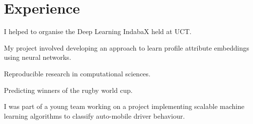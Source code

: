 \documentclass[]{deedy-resume-openfont}
\begin{document}
\begin{minipage}[t]{0.66\textwidth} 


\section{Experience}

\vspace{\topsep}
\begin{tightemize}
\item I helped to organise the Deep Learning IndabaX held at UCT. \href{https://indabax.github.io/}{\custombold{[link]}}
\end{tightemize}
\sectionsep

\begin{tightemize}
\item My project involved developing an approach to learn profile attribute embeddings using neural networks. \href{http://praelexis.com/2017/05/03/1236/}{\custombold{[link]}}
\end{tightemize}
\sectionsep

\begin{tightemize}
	\item Reproducible research in computational sciences. \href{https://blog.dominodatalab.com/reproducible-research-using-domino/}{\custombold{[link]}} 
    \item Predicting winners of the rugby world cup. \href{https://blog.dominodatalab.com/predicting-winners-of-the-rugby-world-cup/}{\custombold{[link]}}
\end{tightemize}
\sectionsep

\begin{tightemize}
\item I was part of a young team working on a project implementing scalable machine learning algorithms to classify auto-mobile driver behaviour. 
\end{tightemize}
\sectionsep


\end{minipage}
\end{document}
